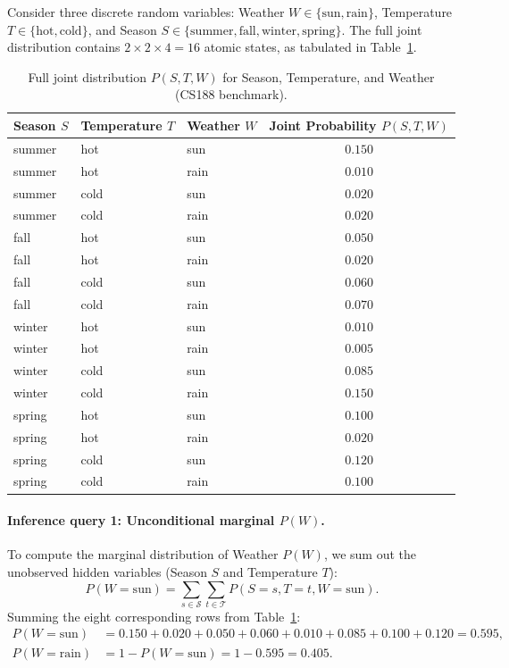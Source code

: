 Consider three discrete random variables: Weather $W \in \{\text{sun}, \text{rain}\}$, Temperature $T \in \{\text{hot}, \text{cold}\}$, and Season $S \in \{\text{summer}, \text{fall}, \text{winter}, \text{spring}\}$. The full joint distribution contains $2 \times 2 \times 4 = 16$ atomic states, as tabulated in Table~\ref{tab:cs188_joint_full}.

\begin{table}[htbp]
\centering
\caption{Full joint distribution $P(S, T, W)$ for Season, Temperature, and Weather (CS188 benchmark).}
\label{tab:cs188_joint_full}
\begin{tabular}{lllc}
\toprule
\textbf{Season $S$} & \textbf{Temperature $T$} & \textbf{Weather $W$} & \textbf{Joint Probability $P(S, T, W)$} \\
\midrule
summer & hot & sun  & $0.150$ \\
summer & hot & rain & $0.010$ \\
summer & cold & sun & $0.020$ \\
summer & cold & rain& $0.020$ \\
\midrule
fall   & hot & sun  & $0.050$ \\
fall   & hot & rain & $0.020$ \\
fall   & cold & sun & $0.060$ \\
fall   & cold & rain& $0.070$ \\
\midrule
winter & hot & sun  & $0.010$ \\
winter & hot & rain & $0.005$ \\
winter & cold & sun & $0.085$ \\
winter & cold & rain& $0.150$ \\
\midrule
spring & hot & sun  & $0.100$ \\
spring & hot & rain & $0.020$ \\
spring & cold & sun & $0.120$ \\
spring & cold & rain& $0.100$ \\
\bottomrule
\end{tabular}
\end{table}

\paragraph{Inference query 1: Unconditional marginal $P(W)$.}
To compute the marginal distribution of Weather $P(W)$, we sum out the unobserved hidden variables (Season $S$ and Temperature $T$):
\begin{equation}
P(W = \text{sun}) = \sum_{s \in \mathcal{S}} \sum_{t \in \mathcal{T}} P(S = s, T = t, W = \text{sun}).
\end{equation}
Summing the eight corresponding rows from Table~\ref{tab:cs188_joint_full}:
\begin{align}
P(W = \text{sun}) &= 0.150 + 0.020 + 0.050 + 0.060 + 0.010 + 0.085 + 0.100 + 0.120 = 0.595, \\
P(W = \text{rain}) &= 1 - P(W = \text{sun}) = 1 - 0.595 = 0.405.
\end{align}

